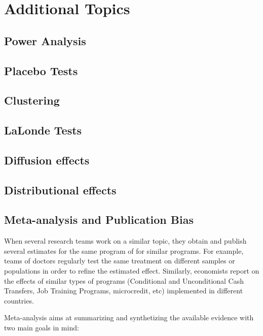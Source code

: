 \documentclass[]{book}
\theoremstyle{definition}
\theoremstyle{definition}
\theoremstyle{definition}
\theoremstyle{remark}
\begin{document}
\part{Additional Topics}\label{part-additional-topics}

\chapter{Power Analysis}\label{Power}

\chapter{Placebo Tests}\label{Placebo}

\chapter{Clustering}\label{cluster}

\chapter{LaLonde Tests}\label{LaLonde}

\chapter{Diffusion effects}\label{Diffusion}

\chapter{Distributional effects}\label{Distribution}

\chapter{Meta-analysis and Publication Bias}\label{sec:meta}

When several research teams work on a similar topic, they obtain and
publish several estimates for the same program of for similar programs.
For example, teams of doctors regularly test the same treatment on
different samples or populations in order to refine the estimated
effect. Similarly, economists report on the effects of similar types of
programs (Conditional and Unconditional Cash Transfers, Job Training
Programs, microcredit, etc) implemented in different countries.

Meta-analysis aims at summarizing and synthetizing the available
evidence with two main goals in mind:
\end{document}
